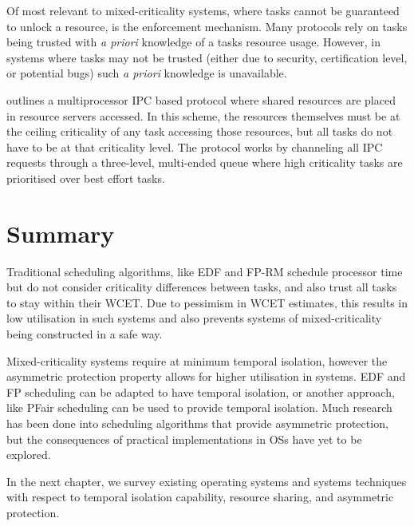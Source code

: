 Of most relevant to mixed-criticality systems, where tasks cannot be guaranteed to unlock a
resource, is the enforcement mechanism.  Many protocols rely on tasks being trusted with \emph{a
priori} knowledge of a tasks resource usage.  However, in systems where tasks may not be trusted
(either due to security, certification level, or potential bugs) such \emph{a priori}
knowledge is unavailable. 

\citet{Brandenburg_14} outlines a multiprocessor \gls{IPC} based protocol where shared resources are placed in
resource servers accessed. In this scheme, the resources themselves must be at the ceiling
criticality of any task accessing those resources, but all tasks do not have to be at that
criticality level. The protocol works by channeling all IPC requests through a three-level,
multi-ended queue where high criticality tasks are prioritised over best effort tasks. 

\section{Summary}


Traditional scheduling algorithms, like \gls{EDF} and \gls{FP}-\gls{RM} schedule processor time but do not consider criticality differences between tasks, and also trust all tasks to stay within their \gls{WCET}.
Due to pessimism in \gls{WCET} estimates, this results in low utilisation in such systems and also prevents systems of mixed-criticality being constructed in a safe way.

Mixed-criticality systems require at minimum temporal isolation, however the asymmetric protection property allows for higher utilisation in systems.
\gls{EDF} and \gls{FP} scheduling can be adapted to have temporal isolation, or another approach, like PFair scheduling can be used to provide temporal isolation.
Much research has been done into scheduling algorithms that provide asymmetric protection, but the consequences of practical implementations in \glspl{OS} have yet to be explored.

In the next chapter, we survey existing operating systems and systems techniques with respect to temporal isolation capability, resource sharing, and asymmetric protection.

